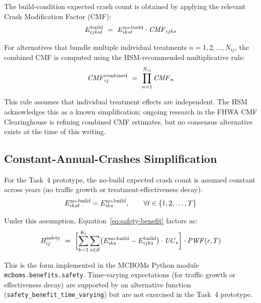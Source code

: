 The build-condition expected crash count is obtained by applying the relevant
Crash Modification Factor (CMF):
\begin{equation}
E^{\mathrm{build}}_{ijkst}\ =\ E^{\mathrm{no\text{-}build}}_{ikst} \cdot \mathit{CMF}_{ijks}
\label{eq:build-crashes}
\end{equation}

\noindent For alternatives that bundle multiple individual treatments
$n = 1, 2, \ldots, N_{ij}$, the combined CMF is computed using the
HSM-recommended multiplicative rule:
\begin{equation}
\CMF^{\mathrm{combined}}_{ij}\ =\ \prod_{n=1}^{N_{ij}} \CMF_n
\label{eq:cmf-combine}
\end{equation}

This rule assumes that individual treatment effects are independent. The HSM
acknowledges this as a known simplification; ongoing research in the FHWA CMF
Clearinghouse is refining combined CMF estimates, but no consensus alternative
exists at the time of this writing.

\subsection{Constant-Annual-Crashes Simplification}

For the Task~4 prototype, the no-build expected crash count is assumed
constant across years (no traffic growth or treatment-effectiveness decay):
\begin{equation*}
E^{\mathrm{no\text{-}build}}_{ikst} = E^{\mathrm{no\text{-}build}}_{iks}, \qquad \forall t \in \{1, 2, \ldots, T\}
\end{equation*}

Under this assumption, Equation~\ref{eq:safety-benefit} factors as:
\begin{equation}
B^{\mathrm{safety}}_{ij}\ =\ \biggl[ \sum_{k=1}^{K_i} \sum_{s \in \mathcal{S}}
  \bigl(E^{\mathrm{no\text{-}build}}_{iks} - E^{\mathrm{build}}_{ijks}\bigr) \cdot \mathit{UC}_s \biggr]
  \cdot \mathit{PWF}(r, T)
\label{eq:safety-benefit-pwf}
\end{equation}

This is the form implemented in the MCBOMs Python module
\texttt{mcboms.benefits.safety}. Time-varying expectations (for traffic growth
or effectiveness decay) are supported by an alternative function
(\texttt{safety\_benefit\_time\_varying}) but are not exercised in the Task~4
prototype.

